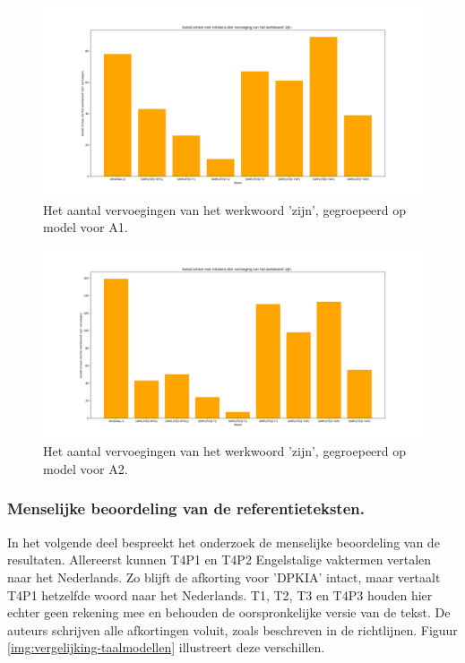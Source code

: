 \begin{figure}[H]
	\includegraphics[width=\linewidth]{img/boxplot-tobe-a1.png}
	\caption{Het aantal vervoegingen van het werkwoord 'zijn', gegroepeerd op model voor A1.}
	\label{img:histplot-tobe-a1}
\end{figure}

\begin{figure}[H]
	\includegraphics[width=\linewidth]{img/boxplot-tobe-a2.png}
	\caption{Het aantal vervoegingen van het werkwoord 'zijn', gegroepeerd op model voor A2.}
	\label{img:histplot-tobe-a2}
\end{figure}

\subsubsection{Menselijke beoordeling van de referentieteksten.}

In het volgende deel bespreekt het onderzoek de menselijke beoordeling van de resultaten. Allereerst kunnen T4P1 en T4P2 Engelstalige vaktermen vertalen naar het Nederlands. Zo blijft de afkorting voor 'DPKIA' intact, maar vertaalt T4P1 hetzelfde woord naar het Nederlands.  T1, T2, T3 en T4P3 houden hier echter geen rekening mee en behouden de oorspronkelijke versie van de tekst. De auteurs schrijven alle afkortingen voluit, zoals beschreven in de richtlijnen. Figuur \ref{img:vergelijking-taalmodellen} illustreert deze verschillen.

